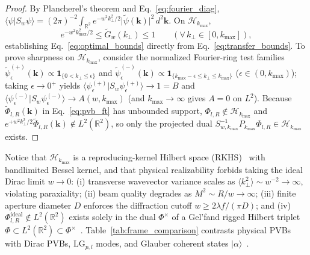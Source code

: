\documentclass[aps,pra,onecolumn,notitlepage,11pt,tightenlines,amsmath,amssymb,floatfix,longbibliography]{revtex4-2}
\providecommand{\ket}[1]{\lvert#1\rangle}
\providecommand{\braket}[2]{\langle#1\vert#2\rangle}
\providecommand{\abs}[1]{\lvert#1\rvert}
\begin{document}
\begin{proof}
By Plancherel's theorem and Eq.~\eqref{eq:fourier_diag}, $\braket{\psi}{S_w\psi} = (2\pi)^{-2}\int_{\mathbb{R}^2} e^{-w^2 k_\perp^2/2}\abs{\widetilde{\psi}(\mathbf{k})}^2\,d^2\mathbf{k}$. On $\mathcal{H}_{k_{\max}}$,
\begin{equation}
e^{-w^2 k_{\max}^2/2} \le \widetilde{G}_w(k_\perp) \le 1 \qquad (\forall\, k_\perp \in [0, k_{\max}]),
\label{eq:transfer_bounds}
\end{equation}
establishing Eq.~\eqref{eq:optimal_bounds} directly from Eq.~\eqref{eq:transfer_bounds}. To prove sharpness on $\mathcal{H}_{k_{\max}}$, consider the normalized Fourier-ring test families $\widetilde{\psi}_\epsilon^{(+)}(\mathbf{k}) \propto \mathbf{1}_{\{0 < k_\perp \le \epsilon\}}$ and $\widetilde{\psi}_\epsilon^{(-)}(\mathbf{k}) \propto \mathbf{1}_{\{k_{\max}-\epsilon \le k_\perp \le k_{\max}\}}$ ($\epsilon \in (0, k_{\max})$); taking $\epsilon \to 0^+$ yields $\braket{\psi_\epsilon^{(+)}}{S_w\psi_\epsilon^{(+)}} \to 1 = B$ and $\braket{\psi_\epsilon^{(-)}}{S_w\psi_\epsilon^{(-)}} \to A(w,k_{\max})$ (and $k_{\max} \to \infty$ gives $A=0$ on $L^2$). Because $\widetilde{\Phi}_{l,R}(\mathbf{k})$ in Eq.~\eqref{eq:pvb_ft} has unbounded support, $\Phi_{l,R} \notin \mathcal{H}_{k_{\max}}$ and $e^{+w^2 k_\perp^2/2}\widetilde{\Phi}_{l,R}(\mathbf{k}) \notin L^2(\mathbb{R}^2)$, so only the projected dual $S_{w,k_{\max}}^{-1}P_{k_{\max}}\Phi_{l,R} \in \mathcal{H}_{k_{\max}}$ exists.
\end{proof}

Notice that $\mathcal{H}_{k_{\max}}$ is a reproducing-kernel Hilbert space (RKHS)~\cite{PaulsenRaghupathi2016} with bandlimited Bessel kernel, and that physical realizability forbids taking the ideal Dirac limit $w \to 0$: (i) transverse wavevector variance scales as $\langle k_\perp^2 \rangle \sim w^{-2} \to \infty$, violating paraxiality; (ii) beam quality degrades as $M^2 \sim R/w \to \infty$; (iii) finite aperture diameter $D$ enforces the diffraction cutoff $w \ge 2\lambda f/(\pi D)$; and (iv) $\Phi_{l,R}^{\mathrm{ideal}} \notin L^2(\mathbb{R}^2)$ exists solely in the dual $\Phi^\times$ of a Gel'fand rigged Hilbert triplet $\Phi \subset L^2(\mathbb{R}^2) \subset \Phi^\times$~\cite{Gelfand1964}. Table~\ref{tab:frame_comparison} contrasts physical PVBs with Dirac PVBs, $\mathrm{LG}_{p,l}$ modes, and Glauber coherent states $\ket{\alpha}$~\cite{Klauder1985,Perelomov1986,Gazeau2009}.
\end{document}
